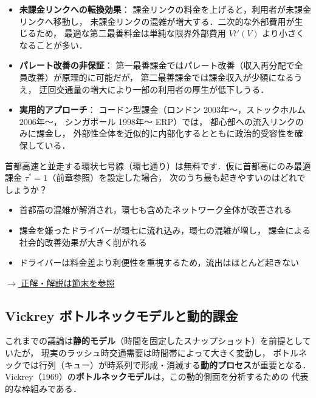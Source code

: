 \begin{itemize}
  \item \textbf{未課金リンクへの転換効果}：
        課金リンクの料金を上げると，利用者が未課金リンクへ移動し，
        未課金リンクの混雑が増大する．二次的な外部費用が生じるため，
        最適な第二最善料金は単純な限界外部費用 $V t'(V)$ より小さくなることが多い．

  \item \textbf{パレート改善の非保証}：
        第一最善課金ではパレート改善（収入再分配で全員改善）が原理的に可能だが，
        第二最善課金では課金収入が少額になるうえ，
        迂回交通量の増大により一部の利用者の厚生が低下しうる．

  \item \textbf{実用的アプローチ}：
        コードン型課金（ロンドン 2003年〜，ストックホルム 2006年〜，
        シンガポール 1998年〜 ERP）では，
        都心部への流入リンクのみに課金し，
        外部性全体を近似的に内部化するとともに政治的受容性を確保している\cite{Vickrey1969}．
\end{itemize}
\begin{example}[title={クイズ 10：首都高だけに課金したら，環七はどうなる？}]
首都高速と並走する環状七号線（環七通り）は無料です．仮に首都高にのみ最適課金 $\tau^*=1$（前章参照）を設定した場合，
次のうち最も起きやすいのはどれでしょうか？
\begin{itemize}
  \item[(ア)] 首都高の混雑が解消され，環七も含めたネットワーク全体が改善される
  \item[(イ)] 課金を嫌ったドライバーが環七に流れ込み，環七の混雑が増し，
             課金による社会的改善効果が大きく削がれる
  \item[(ウ)] ドライバーは料金差より利便性を重視するため，流出はほとんど起きない
\end{itemize}
\hyperref[ans:q10]{$\rightarrow$ 正解・解説は節末を参照}
\end{example}
\subsection{Vickrey ボトルネックモデルと動的課金}
\label{subsec:vickrey-bottleneck}

これまでの議論は\textbf{静的モデル}（時間を固定したスナップショット）を前提としていたが，
現実のラッシュ時交通需要は時間帯によって大きく変動し，
ボトルネックでは行列（キュー）が時系列で形成・消滅する\textbf{動的プロセス}が重要となる．
Vickrey（1969）の\textbf{ボトルネックモデル}は，この動的側面を分析するための
代表的な枠組みである\cite{Vickrey1969}．

